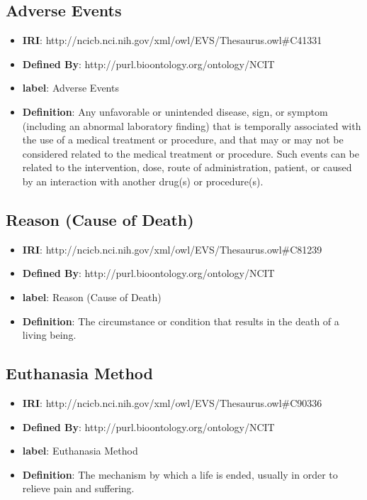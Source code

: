 \documentclass[a4paper,12pt,oneside]{article}
\begin{document}
  \subsection{Adverse Events}

\begin{itemize}
	\item \textbf{IRI}: http://ncicb.nci.nih.gov/xml/owl/EVS/Thesaurus.owl\#C41331
	\item \textbf{Defined By}: http://purl.bioontology.org/ontology/NCIT
	\item \textbf{label}: Adverse Events
	\item \textbf{Definition}: Any unfavorable or unintended disease, sign, or symptom (including an abnormal laboratory finding) that is temporally associated with the use of a medical treatment or procedure, and that may or may not be considered related to the medical treatment or procedure. Such events can be related to the intervention, dose, route of administration, patient, or caused by an interaction with another drug(s) or procedure(s).
\end{itemize} 

\subsection{Reason (Cause of Death)}

\begin{itemize}
	\item \textbf{IRI}: http://ncicb.nci.nih.gov/xml/owl/EVS/Thesaurus.owl\#C81239
	\item \textbf{Defined By}: http://purl.bioontology.org/ontology/NCIT
	\item \textbf{label}: Reason (Cause of Death)
	\item \textbf{Definition}: The circumstance or condition that results in the death of a living being.
\end{itemize} 

  \subsection{Euthanasia Method}

\begin{itemize}
	\item \textbf{IRI}:  	
	http://ncicb.nci.nih.gov/xml/owl/EVS/Thesaurus.owl\#C90336
	\item \textbf{Defined By}: http://purl.bioontology.org/ontology/NCIT
	\item \textbf{label}: Euthanasia Method
	\item \textbf{Definition}: The mechanism by which a life is ended, usually in order to relieve pain and suffering.
\end{itemize} 
 
\end{document}
